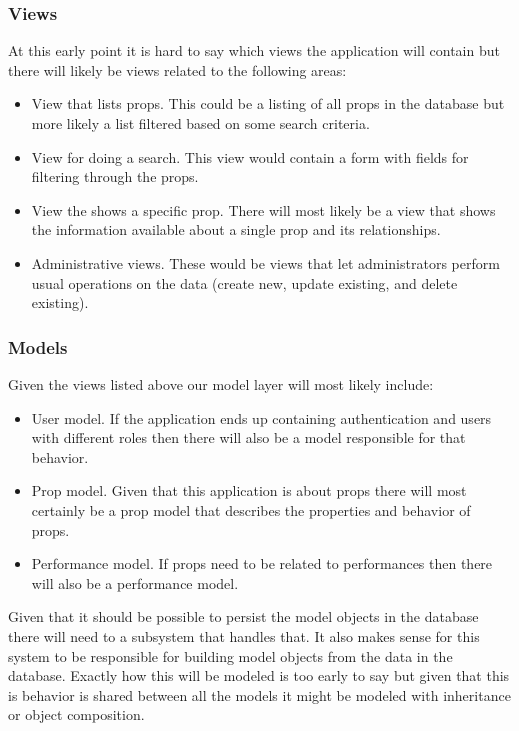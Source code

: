 \documentclass[12pt]{article}
\begin{document}
\subsubsection{Views}
At this early point it is hard to say which views the application will contain
but there will likely be views related to the following areas:

\begin{itemize}
  \item View that lists props. This could be a listing of all props in the database but more likely a list filtered based on some search criteria.
  \item View for doing a search. This view would contain a form with fields for filtering through the props.
  \item View the shows a specific prop. There will most likely be a view that shows the information available about a single prop and its relationships.
  \item Administrative views. These would be views that let administrators perform usual operations on the data (create new, update existing, and delete existing).
\end{itemize}

\subsubsection{Models}
Given the views listed above our model layer will most likely include:

\begin{itemize}
  \item User model. If the application ends up containing authentication and users with different roles then there will also be a model responsible for that behavior.
  \item Prop model. Given that this application is about props there will most certainly be a prop model that describes the properties and behavior of props.
  \item Performance model. If props need to be related to performances then there will also be a performance model.
\end{itemize}
Given that it should be possible to persist the model objects in the database
there will need to a subsystem that handles that. It also makes sense for this
system to be responsible for building model objects from the data in the
database. Exactly how this will be modeled is too early to say but given that
this is behavior is shared between all the models it might be modeled with
inheritance or object composition.
\end{document}
